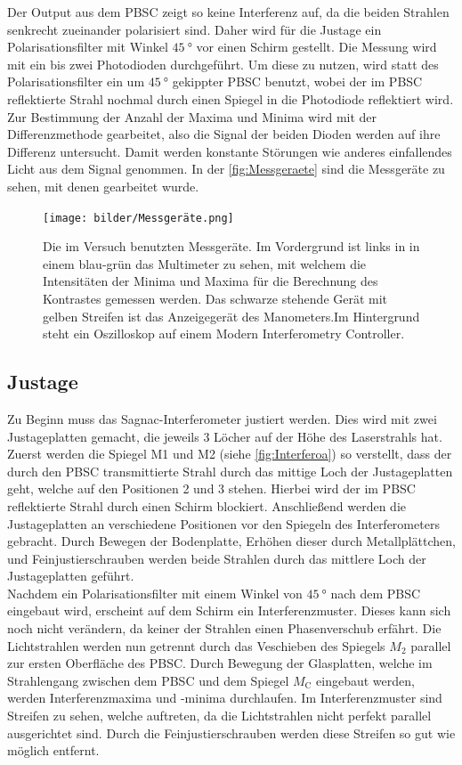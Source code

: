 \noindent Der Output aus dem PBSC zeigt so keine Interferenz auf, da die beiden Strahlen senkrecht zueinander polarisiert sind. Daher wird für die Justage ein Polarisationsfilter mit 
Winkel $\SI{45}{\degree}$ vor einen Schirm gestellt. Die Messung wird mit ein bis zwei Photodioden durchgeführt. Um diese zu nutzen, wird statt des Polarisationsfilter ein um 
$\SI{45}{\degree}$ gekippter PBSC benutzt, wobei der im PBSC reflektierte Strahl nochmal durch einen Spiegel in die Photodiode reflektiert wird. Zur Bestimmung der Anzahl der Maxima 
und Minima wird mit der Differenzmethode gearbeitet, also die Signal der beiden Dioden werden auf ihre Differenz untersucht. Damit werden konstante Störungen wie anderes einfallendes 
Licht aus dem Signal genommen. In der \autoref{fig:Messgeraete} sind die Messgeräte zu sehen, mit denen gearbeitet wurde.

\begin{figure}[H]
    \centering
    \texttt{[image: bilder/Messgeräte.png]}
    \caption{Die im Versuch benutzten Messgeräte. Im Vordergrund ist links in 
    in einem blau-grün das Multimeter zu sehen, mit welchem die Intensitäten der Minima und Maxima für die Berechnung des Kontrastes gemessen werden.
    Das schwarze stehende Gerät mit gelben Streifen ist das Anzeigegerät des Manometers.Im Hintergrund steht ein Oszilloskop auf einem 
    Modern Interferometry Controller.}
    \label{fig:Messgeraete}
\end{figure}


\subsection{Justage}

\noindent Zu Beginn muss das Sagnac-Interferometer justiert werden. Dies wird mit zwei Justageplatten gemacht, die jeweils 3 Löcher auf der Höhe des Laserstrahls hat. 
Zuerst werden die Spiegel M1 und M2 (siehe \autoref{fig:Interferoa}) so verstellt, dass der durch den PBSC transmittierte Strahl durch das mittige Loch der Justageplatten geht, welche 
auf den Positionen 2 und 3 stehen. Hierbei wird der im PBSC reflektierte Strahl durch einen Schirm blockiert. 
Anschließend werden die Justageplatten an verschiedene Positionen vor den Spiegeln des Interferometers gebracht. Durch Bewegen der Bodenplatte, Erhöhen dieser durch Metallplättchen, 
und Feinjustierschrauben werden beide Strahlen durch das mittlere Loch der Justageplatten geführt. \\
Nachdem ein Polarisationsfilter mit einem Winkel von $\SI{45}{\degree}$ nach dem PBSC eingebaut wird, erscheint auf dem Schirm ein Interferenzmuster. Dieses kann sich noch nicht verändern, 
da keiner der Strahlen einen Phasenverschub erfährt. Die Lichtstrahlen werden nun getrennt durch das Veschieben des Spiegels $M_2$ parallel zur ersten Oberfläche des PBSC. 
Durch Bewegung der Glasplatten, welche im Strahlengang zwischen dem PBSC und dem Spiegel $M_{\text{C}}$ eingebaut werden, werden Interferenzmaxima und -minima durchlaufen.
Im Interferenzmuster sind Streifen zu sehen, welche auftreten, da die Lichtstrahlen nicht perfekt parallel ausgerichtet sind. Durch die Feinjustierschrauben werden diese Streifen 
so gut wie möglich entfernt. 


